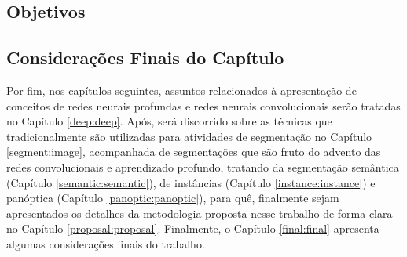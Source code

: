 \subsection{Objetivos}
\label{intro:objective}

\subsection{Considerações Finais do Capítulo}
\label{intro:end}

Por fim, nos capítulos seguintes, assuntos relacionados à apresentação de conceitos de redes neurais profundas e redes neurais convolucionais serão tratadas no Capítulo \ref{deep:deep}. Após, será discorrido sobre as técnicas que tradicionalmente são utilizadas para atividades de segmentação no Capítulo \ref{segment:image}, acompanhada de segmentações que são fruto do advento das redes convolucionais e aprendizado profundo, tratando da segmentação semântica (Capítulo \ref{semantic:semantic}), de instâncias (Capítulo \ref{instance:instance}) e panóptica (Capítulo \ref{panoptic:panoptic}), para quê, finalmente sejam apresentados os detalhes da metodologia proposta nesse trabalho de forma clara no Capítulo \ref{proposal:proposal}.  Finalmente, o Capítulo \ref{final:final} apresenta algumas considerações finais do trabalho.